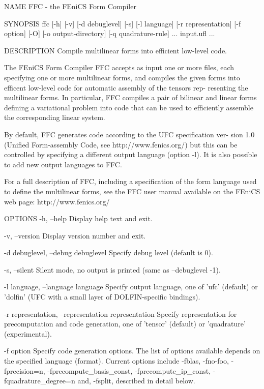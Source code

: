 NAME
       FFC - the FEniCS Form Compiler


SYNOPSIS
       ffc [-h] [-v] [-d debuglevel] [-s] [-l language] [-r representation]
       [-f option] [-O] [-o output-directory] [-q quadrature-rule] ...
       input.ufl ...


DESCRIPTION
       Compile multilinear forms into efficient low-level code.

       The FEniCS Form Compiler FFC accepts as input one or more  files,  each
       specifying  one or more multilinear forms, and compiles the given forms
       into efficent low-level code for automatic assembly of the tensors rep-
       resenting  the multilinear forms. In particular, FFC compiles a pair of
       bilinear and linear forms defining a variational problem into code that
       can be used to efficiently assemble the corresponding linear system.

       By  default, FFC generates code according to the UFC specification ver-
       sion 1.0 (Unified Form-assembly Code, see  http://www.fenics.org/)  but
       this  can  be  controlled  by  specifying  a  different output language
       (option -l). It is also possible to add new output languages to FFC.

       For a full description of FFC, including a specification  of  the  form
       language  used to define the multilinear forms, see the FFC user manual
       available on the FEniCS web page: http://www.fenics.org/


OPTIONS
       -h, --help
              Display help text and exit.

       -v, --version
              Display version number and exit.

       -d debuglevel, --debug debuglevel
              Specify debug level (default is 0).

       -s, --silent
              Silent mode, no output is printed (same as --debuglevel -1).

       -l language, --language language
              Specify output language, one of 'ufc' (default) or 'dolfin' (UFC
              with a small layer of DOLFIN-specific bindings).

       -r representation, --representation representation
              Specify  representation  for precomputation and code generation,
              one of 'tensor' (default) or 'quadrature' (experimental).

       -f option
              Specify code generation options. The list of options available
              depends on the specified  language  (format). Current  options  
              include  -fblas, -fno-foo, -fprecision=n,
              -fprecompute_basis_const, -fprecompute_ip_const,
              -fquadrature_degree=n and, -fsplit, described in detail below.

